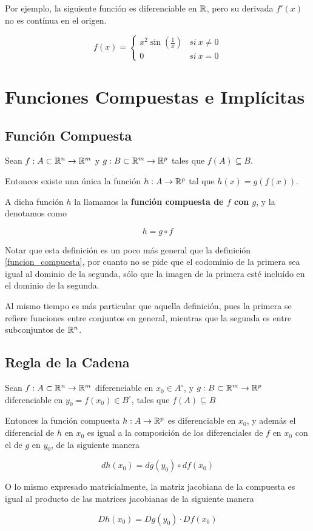 Por ejemplo, la siguiente función es diferenciable en $\mathbb{R}$, pero su derivada $f'(x)$ no es contínua en el origen.

$$ f(x) = \begin{cases} x^2 \sin(\frac{1}{x}) & si \ x \neq 0 \\ 0 & si \ x=0 \end{cases} $$


\chapter{Funciones Compuestas e Implícitas}

\section{Función Compuesta}

\begin{definition}
Sean $ f : A \subset \mathbb{R}^n \to \mathbb{R}^m$ y $ g : B \subset \mathbb{R}^m \to \mathbb{R}^p$ tales que $f(A) \subseteq B$.

Entonces existe una única la función $ h : A \to \mathbb{R}^p$ tal que $h(x) = g(f(x))$.  

A dicha función $h$ la llamamos la \textbf{función compuesta de $f$ con $g$}, y la denotamos como 

$$ h = g \circ f$$
\end{definition}

Notar que esta definición es un poco más general que la definición \ref{funcion_compuesta}, por cuanto no se pide que el codominio de la primera sea igual al dominio de la segunda, sólo que la imagen de la primera esté incluído en el dominio de la segunda.

Al mismo tiempo es más particular que aquella definición, pues la primera se refiere funciones entre conjuntos en general, mientras que la segunda es entre subconjuntos de $\mathbb{R}^n$.

\section{Regla de la Cadena}

\begin{theorem} \label{regla_cadena} 
Sean $ f : A \subset \mathbb{R}^n \to \mathbb{R}^m$ diferenciable en $x_0 \in A^{\circ}$, y $ g : B \subset \mathbb{R}^m \to \mathbb{R}^p$ diferenciable en $y_0 = f(x_0) \in B^{\circ}$, tales que $f(A) \subseteq B$

Entonces la función compuesta $h : A \to \mathbb{R}^p$ es diferenciable en $x_0$, y además el diferencial de $h$ en $x_0$ es igual a la composición de los diferenciales de $f$ en $x_0$ con el de $g$ en $y_0$, de la siguiente manera

$$ dh(x_0) = dg(y_0) \circ df(x_0) $$

O lo mismo expresado matricialmente, la matriz jacobiana de la compuesta es igual al producto de las matrices jacobianas de la siguiente manera

$$ Dh(x_0) = Dg(y_0) \cdot Df(x_0) $$
\end{theorem}

